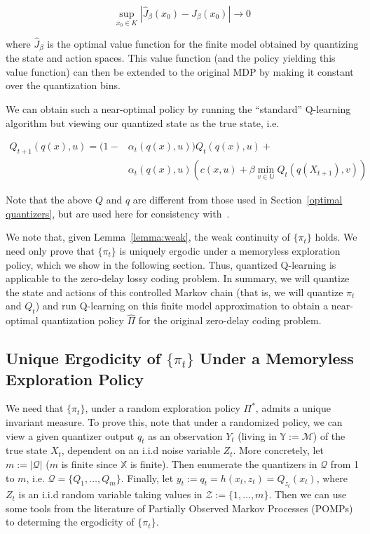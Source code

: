 \documentclass{article}
\begin{document}
\[ \sup_{x_0 \in K}|\hat{J}_{\beta}(x_0) - J_{\beta}(x_0)| \to 0 \]

where \( \hat{J}_{\beta} \) is the optimal value function for the finite model obtained by quantizing the state and action spaces. This value function (and the policy yielding this value function) can then be extended to the original MDP by making it constant over the quantization bins.

We can obtain such a near-optimal policy by running the ``standard'' Q-learning algorithm but viewing our quantized state as the true state, i.e.

\begin{equation}
    \begin{split}
        Q_{t+1}(q(x),u) = (1- & \alpha_t(q(x),u))Q_t(q(x),u) + \\
        & \alpha_t(q(x),u)(c(x,u)+\beta \; \underset{v\in\mathbb{U}}{\text{min}} \; Q_t(q(X_{t+1}),v))\label{eq:2}
    \end{split}
\end{equation}

Note that the above \( Q \) and \( q \) are different from those used in Section~\ref{optimal quantizers}, but are used here for consistency with~\cite{Kara}.

We note that, given Lemma~\ref{lemma:weak}, the weak continuity of \( \{\pi_t\} \) holds. We need only prove that \( \{\pi_t\} \) is uniquely ergodic under a memoryless exploration policy, which we show in the following section. Thus, quantized Q-learning is applicable to the zero-delay lossy coding problem. In summary, we will quantize the state and actions of this controlled Markov chain (that is, we will quantize \( \pi_t \) and \( Q_t \)) and run Q-learning on this finite model approximation to obtain a near-optimal quantization policy \( \hat{\Pi} \) for the original zero-delay coding problem.
\newpage
\subsection{Unique Ergodicity of \( \{\pi_t\} \) Under a Memoryless Exploration Policy}\label{section:unique-ergodicity}
We need that \( \{\pi_t\} \), under a random exploration policy \( \Pi^* \), admits a unique invariant measure. To prove this, note that under a randomized policy, we can view a given quantizer output \( q_t \) as an observation \( Y_t \) (living in \( \mathbb{Y} := \mathcal{M} \)) of the true state \( X_t \), dependent on an i.i.d noise variable \( Z_t \). More concretely, let \( m := |\mathcal{Q}| \) (\( m \) is finite since \( \mathbb{X} \) is finite). Then enumerate the quantizers in \( \mathcal{Q} \) from 1 to \( m \), i.e. \( \mathcal{Q} = \{ Q_1,\ldots,Q_m \} \). Finally, let \( y_t := q_t = h(x_t,z_t) = Q_{z_t}(x_t) \), where \( Z_t \) is an i.i.d random variable taking values in \( \mathcal{Z} := \{1,\ldots,m\} \). Then we can use some tools from the literature of Partially Observed Markov Processes (POMPs) to determing the ergodicity of \( \{\pi_t\} \).
\end{document}
